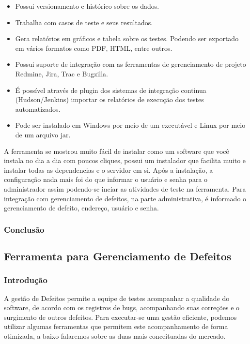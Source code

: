 \documentclass[12pt,a4paper]{article}
\begin{document}
			\begin{itemize}
			  \item Possui versionamento e histórico sobre os dados.
			  \item Trabalha com casos de teste e seus resultados.
			  \item Gera relatórios em gráficos e tabela sobre os testes. Podendo ser exportado em vários formatos como PDF,
			  HTML, entre outros.
			  \item Possui suporte de integração com as ferramentas de gerenciamento de projeto Redmine, Jira, Trac e Bugzilla.
			  \item É possível através de plugin dos sistemas de integração continua (Hudson/Jenkins) importar os relatórios de
			  execução dos testes automatizados.
			  \item Pode ser instalado em Windows por meio de um executável e Linux por meio de um arquivo jar.
			\end{itemize}
			
			A ferramenta se mostrou muito fácil de instalar como um software que você instala no dia a dia com poucos cliques,
			possui um instalador que facilita muito e instalar todas as dependencias e o servidor em si. Após a instalação, a
			configuração nada mais foi do que informar o usuário e senha para o administrador assim podendo-se inciar as
			atividades de teste na ferramenta. Para integração com gerenciamento de defeitos, na parte administrativa, é
			informado o gerenciamento de defeito, endereço, usuário e senha. 
			
		\subsubsection{Conclusão}

	\clearpage		
	\subsection{Ferramenta para Gerenciamento de Defeitos}
	
		\subsubsection{Introdução}
		
			A gestão de Defeitos permite a equipe de testes acompanhar a qualidade do software, 
			de acordo com os registros de bugs, acompanhando suas correções e o surgimento de outros defeitos. 
			Para executar-se uma gestão eficiente, podemos utilizar algumas ferramentas que permitem este acompanhamento de forma otimizada, 
			a baixo falaremos sobre as duas mais conceituadas do mercado.
			
\end{document}
